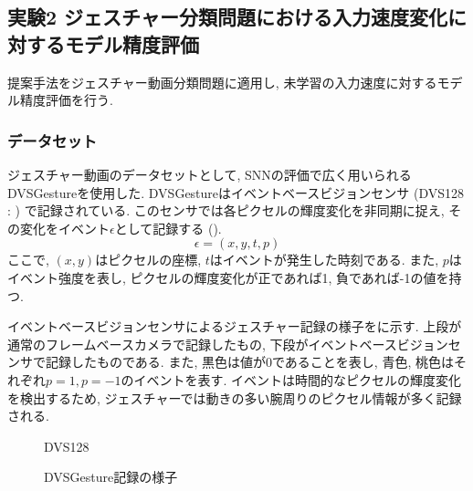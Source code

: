 \subsection{実験2 ジェスチャー分類問題における入力速度変化に対するモデル精度評価}
提案手法をジェスチャー動画分類問題に適用し, 未学習の入力速度に対するモデル精度評価を行う.

\subsubsection{データセット}
ジェスチャー動画のデータセットとして, SNNの評価で広く用いられる\cite{massa2020efficient}DVSGesture\cite{dvsgesture}を使用した.
DVSGestureはイベントベースビジョンセンサ (DVS128 : ) で記録されている.
このセンサでは各ピクセルの輝度変化を非同期に捉え, その変化をイベント$\epsilon$として記録する ().
\begin{equation}
    \epsilon = (x, y, t, p) \label{eq:dvs:event}
\end{equation}
ここで, $(x, y)$はピクセルの座標, $t$はイベントが発生した時刻である.
また, $p$はイベント強度を表し, ピクセルの輝度変化が正であれば1, 負であれば-1の値を持つ.

イベントベースビジョンセンサによるジェスチャー記録の様子をに示す.
上段が通常のフレームベースカメラで記録したもの, 下段がイベントベースビジョンセンサで記録したものである.
また, 黒色は値が0であることを表し, 青色, 桃色はそれぞれ$p=1, p=-1$のイベントを表す.
イベントは時間的なピクセルの輝度変化を検出するため, ジェスチャーでは動きの多い腕周りのピクセル情報が多く記録される.
\begin{figure}[htbp]
    \centering

    \begin{minipage}{0.3625\textwidth}
        \centering
        
        \caption[DVS128の外観]{DVS128\cite{dvs128fig}}
        \label{fig:dvs128}
    \end{minipage}
    \hspace{0.02\textwidth}
    \begin{minipage}{0.53746\textwidth}
        \centering
        
        \caption[DVSGesture記録の様子]{DVSGesture記録の様子\cite{dvsgesture}}
        \label{fig:dvs:recordview}
    \end{minipage}
\end{figure}

